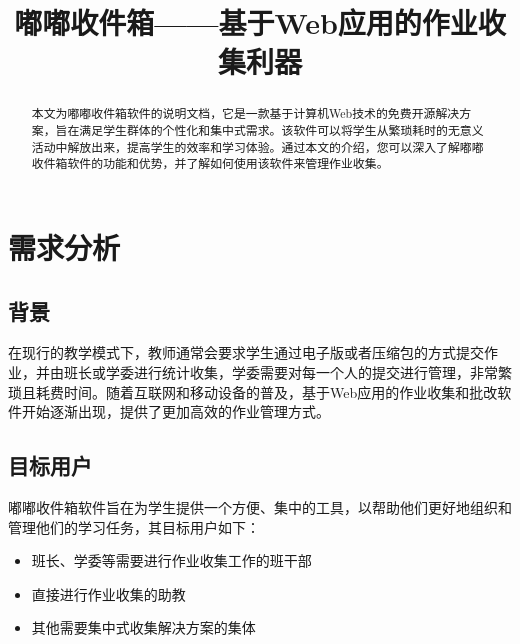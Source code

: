 \documentclass[lang=cn,11pt,a4paper]{elegantpaper}
\title{嘟嘟收件箱——基于Web应用的作业收集利器}
\institute{}
\date{\zhtoday}
\begin{document}
\maketitle
\thispagestyle{empty} %
\begin{abstract}
本文为嘟嘟收件箱软件的说明文档，它是一款基于计算机Web技术的免费开源解决方案，旨在满足学生群体的个性化和集中式需求。该软件可以将学生从繁琐耗时的无意义活动中解放出来，提高学生的效率和学习体验。通过本文的介绍，您可以深入了解嘟嘟收件箱软件的功能和优势，并了解如何使用该软件来管理作业收集。
\end{abstract}
\clearpage %
\tableofcontents
\thispagestyle{empty} %
\clearpage %
\setcounter{page}{1} %
\section{需求分析}
\subsection{背景}
在现行的教学模式下，教师通常会要求学生通过电子版或者压缩包的方式提交作业，并由班长或学委进行统计收集，学委需要对每一个人的提交进行管理，非常繁琐且耗费时间。随着互联网和移动设备的普及，基于Web应用的作业收集和批改软件开始逐渐出现，提供了更加高效的作业管理方式。


\subsection{目标用户}
嘟嘟收件箱软件旨在为学生提供一个方便、集中的工具，以帮助他们更好地组织和管理他们的学习任务，其目标用户如下：
\begin{itemize}
    \item 班长、学委等需要进行作业收集工作的班干部
    \item 直接进行作业收集的助教
    \item 其他需要集中式收集解决方案的集体
\end{itemize}
\end{document}
